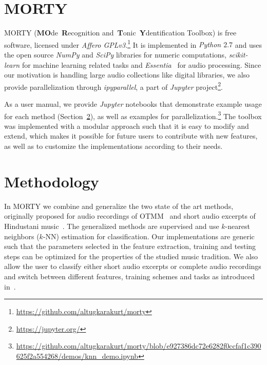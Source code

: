 \documentclass{sig-alternate}
\begin{document}
\section{MORTY}\label{sec:morty}

MORTY (\textbf{MO}de~\textbf{R}ecognition and~\textbf{T}onic~\textbf{Y}dentification Toolbox) is free software, licensed under \emph{Affero GPLv3}.\footnote{\url{https://github.com/altugkarakurt/morty}} It is implemented in \emph{Python $2.7$} and uses the open source \emph{NumPy} and \emph{SciPy} libraries for numeric computations, \emph{scikit-learn} for machine learning related tasks and \emph{Essentia}~\cite{bogdanov2013essentia} for audio processing. Since our motivation is handling large audio collections like digital libraries, we also provide parallelization through \emph{ipyparallel}, a part of \emph{Jupyter} project\footnote{\url{https://jupyter.org/}}.

As a user manual, we provide \emph{Jupyter} notebooks that demonstrate example usage for each method (Section~\ref{sec:methodology}), as well as examples for parallelization.\footnote{\url{https://github.com/altugkarakurt/morty/blob/e927386dc72e6282f0ccfaf1c390625f2a554268/demos/knn_demo.ipynb}} The toolbox was implemented with a modular approach such that it is easy to modify and extend, which makes it possible for future users to contribute with new features, as well as to customize the implementations according to their needs.

\section{Methodology}\label{sec:methodology}

In MORTY we combine and generalize the two state of the art methods, originally proposed for audio recordings of OTMM~\cite{bozkurt_tonic,bozkurt_makam} and short audio excerpts of Hindustani music~\cite{chordia}. The generalized methods are supervised and use $k$-nearest neighbors ($k$-NN) estimation for classification. Our implementations are generic such that the parameters selected in the feature extraction, training and testing steps can be optimized for the properties of the studied music tradition. We also allow the user to classify either short audio excerpts or complete audio recordings and switch between different features, training schemes and tasks as introduced in~\cite{bozkurt_tonic, chordia, bozkurt_makam}. %
\end{document}

